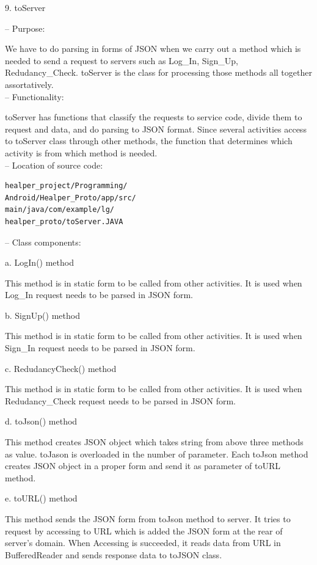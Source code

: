 \documentclass[conference]{IEEEtran}
\begin{document}
9. toServer

 -- Purpose: 
 
 We have to do parsing in forms of JSON when we carry out a method which is needed to send a request to servers such as Log\_{}In, Sign\_{}Up, Redudancy\_{}Check. toServer is the class for processing those methods all together assortatively.\\
 
 -- Functionality: 
 
 toServer has functions that classify the requests to service code, divide them to request and data, and do parsing to JSON format. Since several activities access to toServer class through other methods, the function that determines which activity is from which method is needed. \\ 
 
 -- Location of source code: 

\begin{verbatim}
healper_project/Programming/
Android/Healper_Proto/app/src/
main/java/com/example/lg/
healper_proto/toServer.JAVA
\end{verbatim}

-- Class components:

a. LogIn() method
	
This method is in static form to be called from other activities. It is used when Log\_{}In request needs to be parsed in JSON form.

	
b. SignUp() method
	
This method is in static form to be called from other activities. It is used when Sign\_{}In request needs to be parsed in JSON form.

	
c. RedudancyCheck() method
	
This method is in static form to be called from other activities. It is used when Redudancy\_{}Check request needs to be parsed in JSON form.
	
d. toJson() method
	
This method creates JSON object which takes string from above three methods as value. toJason is overloaded in the number of parameter. Each toJson method creates JSON object in a proper form and send it as parameter of toURL method.
	
e. toURL() method
	
This method sends the JSON form from toJson method to server. It tries to request by accessing to URL which is added the JSON form at the rear of server's domain. When Accessing is succeeded, it reads data from URL in BufferedReader and sends response data to toJSON class.\\\\
\end{document}
